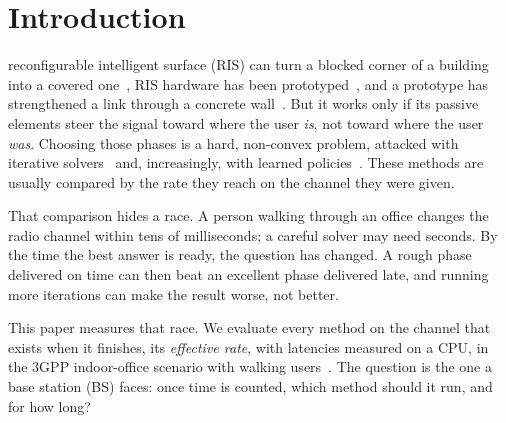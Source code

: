 \section{Introduction}
\label{sec:intro}

 reconfigurable intelligent surface (RIS) can turn a blocked corner of a building into a covered one~\cite{Basar2019Access,Wu2019TWC,DiRenzo2020JSAC,Wu2021TCOM}, RIS hardware has been prototyped~\cite{Dai2020Access}, and a prototype has strengthened a link through a concrete wall~\cite{Pei2021TCOM}. But it works only if its passive elements steer the signal toward where the user \emph{is}, not toward where the user \emph{was}. Choosing those phases is a hard, non-convex problem, attacked with iterative solvers~\cite{Wu2019TWC,Abeywickrama2020TCOM,Pan2020TWC,Guo2020TWC,Choi2024TCOM} and, increasingly, with learned policies~\cite{Huang2020JSAC}. These methods are usually compared by the rate they reach on the channel they were given.

That comparison hides a race. A person walking through an office changes the radio channel within tens of milliseconds; a careful solver may need seconds. By the time the best answer is ready, the question has changed. A rough phase delivered on time can then beat an excellent phase delivered late, and running more iterations can make the result worse, not better.

This paper measures that race. We evaluate every method on the channel that exists when it finishes, its \emph{effective rate}, with latencies measured on a CPU, in the 3GPP indoor-office scenario with walking users~\cite{3gpp_channel}. The question is the one a base station (BS) faces: once time is counted, which method should it run, and for how long?

